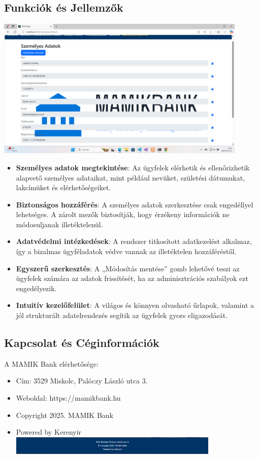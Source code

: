 \documentclass[colorlinks]{thesis-kando}
\theoremstyle{definition}
\theoremstyle{remark}
\begin{document}
\begin{itemize}
\subsection{Funkciók és Jellemzők}
\includegraphics[width=12cm]{figures/szemadatfrontend.png}
\begin{itemize}
    \item \textbf{Személyes adatok megtekintése}: Az ügyfelek elérhetik és ellenőrizhetik alapvető személyes adataikat, mint például nevüket, születési dátumukat, lakcímüket és elérhetőségeiket.
    \item \textbf{Biztonságos hozzáférés}: A személyes adatok szerkesztése csak engedéllyel lehetséges. A zárolt mezők biztosítják, hogy érzékeny információk ne módosuljanak illetéktelenül.
    \item \textbf{Adatvédelmi intézkedések}: A rendszer titkosított adatkezelést alkalmaz, így a bizalmas ügyféladatok védve vannak az illetéktelen hozzáféréstől.
    \item \textbf{Egyszerű szerkesztés}: A „Módosítás mentése” gomb lehetővé teszi az ügyfelek számára az adatok frissítését, ha az adminisztrációs szabályok ezt engedélyezik.
    \item \textbf{Intuitív kezelőfelület}: A világos és könnyen olvasható űrlapok, valamint a jól strukturált adatelrendezés segítik az ügyfelek gyors eligazodását.
   
\end{itemize}


\subsection{Kapcsolat és Céginformációk}
A MAMIK Bank elérhetősége:
\begin{itemize}
    \item Cím: 3529 Miskolc, Palóczy László utca 3.
    \item Weboldal: https://mamikbank.hu
    \item Copyright 2025. MAMIK Bank
    \item Powered by Kerenyir
    \\
    \includegraphics[width=10cm]{figures/Fooldal3.png}

\end{itemize}
\end{itemize}
\end{document}
